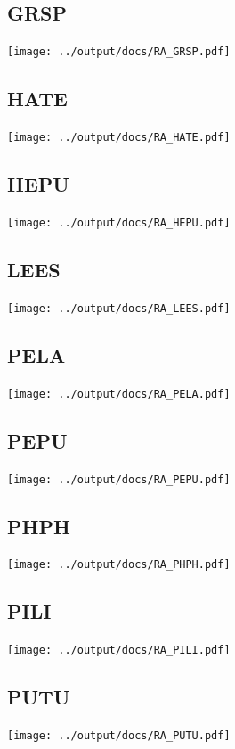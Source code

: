 \documentclass[10pt]{book} %
\begin{document}
\clearpage
\newpage
\subsection{GRSP}
\texttt{[image: ../output/docs/RA\_GRSP.pdf]}

\clearpage
\newpage
\subsection{HATE}
\texttt{[image: ../output/docs/RA\_HATE.pdf]}

\clearpage
\newpage
\subsection{HEPU}
\texttt{[image: ../output/docs/RA\_HEPU.pdf]}

\clearpage
\newpage
\subsection{LEES}
\texttt{[image: ../output/docs/RA\_LEES.pdf]}

\clearpage
\newpage
\subsection{PELA}
\texttt{[image: ../output/docs/RA\_PELA.pdf]}

\clearpage
\newpage
\subsection{PEPU}
\texttt{[image: ../output/docs/RA\_PEPU.pdf]}

\clearpage
\newpage
\subsection{PHPH}
\texttt{[image: ../output/docs/RA\_PHPH.pdf]}

\clearpage
\newpage
\subsection{PILI}
\texttt{[image: ../output/docs/RA\_PILI.pdf]}

\clearpage
\newpage
\subsection{PUTU}
\texttt{[image: ../output/docs/RA\_PUTU.pdf]}
\end{document}
